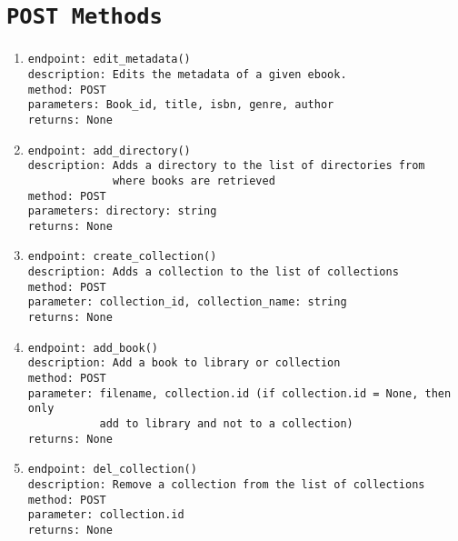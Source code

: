 \documentclass[a4paper, 11pt]{article}
\begin{document}
\section{\texttt{POST Methods}}
\begin{enumerate}
\item \begin{verbatim}
endpoint: edit_metadata()
description: Edits the metadata of a given ebook. 
method: POST
parameters: Book_id, title, isbn, genre, author
returns: None
\end{verbatim}

\item \begin{verbatim}
endpoint: add_directory()
description: Adds a directory to the list of directories from 
             where books are retrieved
method: POST
parameters: directory: string
returns: None
\end{verbatim}

\item \begin{verbatim}
endpoint: create_collection()
description: Adds a collection to the list of collections 
method: POST 
parameter: collection_id, collection_name: string 
returns: None 
\end{verbatim}

\item \begin{verbatim}
endpoint: add_book()
description: Add a book to library or collection 
method: POST 
parameter: filename, collection.id (if collection.id = None, then only 
           add to library and not to a collection)
returns: None
\end{verbatim}

\item \begin{verbatim}
endpoint: del_collection()
description: Remove a collection from the list of collections
method: POST 
parameter: collection.id 
returns: None 
\end{verbatim}

\end{enumerate}
\end{document}
